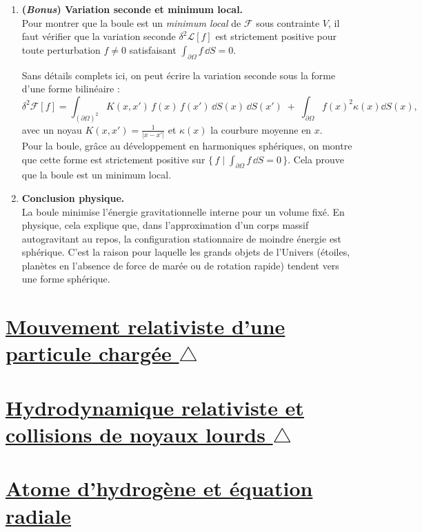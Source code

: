 \documentclass[a4paper,10pt]{report}
\begin{document}
\begin{enumerate}
			\item \textbf{(\emph{Bonus}) Variation seconde et minimum local.}\\
			Pour montrer que la boule est un \emph{minimum local} de \(\mathcal{F}\) sous contrainte \(V\), il faut vérifier que la variation seconde 
			\(\delta^2 \mathcal{L}[f]\) est strictement positive pour toute perturbation \(f\neq 0\) satisfaisant \(\int_{\partial\Omega} f\,\dd S = 0\).
			
			Sans détails complets ici, on peut écrire la variation seconde sous la forme d’une forme bilinéaire :
			\[
			\delta^2 \mathcal{F}[f] 
			= \int_{(\partial\Omega)^2} K(x,x')\,f(x)\,f(x')\,\dd S(x)\,\dd S(x')
			\;+\; \int_{\partial\Omega} f(x)^2 \kappa(x)\dd S(x),
			\]
			avec un noyau \(K(x,x') = \frac{1}{\lvert x - x' \rvert}\) et $\kappa(x)$ la courbure moyenne en $x$.\\ 
			Pour la boule, grâce au développement en harmoniques sphériques, on montre que cette forme est strictement positive sur 
			\(\bigl\{\,f\mid \int_{\partial\Omega} f\,\dd S = 0\,\bigr\}\).  
			Cela prouve que la boule est un minimum local.
			
			\item \textbf{Conclusion physique.}\\
			La boule minimise l’énergie gravitationnelle interne pour un volume fixé.  
			En physique, cela explique que, dans l’approximation d’un corps massif autogravitant au repos, la configuration stationnaire de moindre énergie est sphérique. C’est la raison pour laquelle les grands objets de l’Univers (étoiles, planètes en l’absence de force de marée ou de rotation rapide) tendent vers une forme sphérique.
		\end{enumerate}
		
	\newpage \section{\hyperref[subsec:Rel_eq]{Mouvement relativiste d'une particule chargée  $\triangle$}}\label{subsec:correctionRel_eq}

	
	\newpage \section{\hyperref[subsec:Hyd]{Hydrodynamique relativiste et collisions de noyaux lour\text ds $\triangle$}}\label{subsec:correctionHyd}
	
	\newpage \section{\hyperref[subsec:Atom]{Atome d'hydrogène et équation radiale}}\label{subsec:correctionAtom}
	
\end{document}
